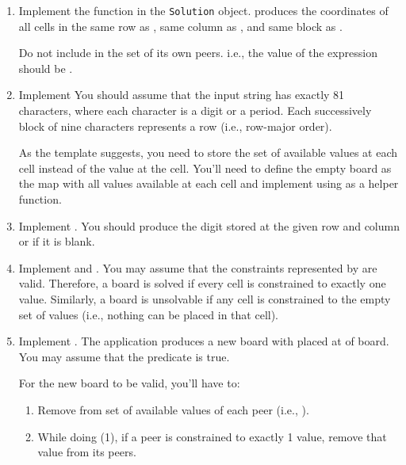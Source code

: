 \documentclass[9pt]{extbook}
\begin{document}
\begin{enumerate}

\item Implement the  function in the \lstinline|Solution|
object.
  produces the coordinates of all cells in the same row as , 
same column as , and same block as .

   Do not include  in the set of its own peers. i.e., the value of
   the expression
    should be .

\item Implement  You should assume that the input 
string has exactly 81 characters, where each character is a digit or a period. 
Each successively block of nine characters represents a row (i.e., row-major order).

   As the template suggests, you need to store the set of available values at
   each cell instead of the value at the cell. You'll need to define
   the empty board as the map with all values available at each cell and
   implement  using  as a helper function.

\item Implement . You should produce the digit stored 
at the given row and column or  if it is blank.

\item Implement  and . You may assume
   that the constraints represented by  are valid. Therefore, a board
   is solved if every cell is constrained to exactly one value. Similarly,
   a board is unsolvable if any cell is constrained to the empty set of values
   (i.e., nothing can be placed in that cell).

\item Implement . The application 
 produces a new board with
    placed at  of 
    board.  You may assume that
   the predicate  is true.

   For the new board to be valid, you'll have to:

   \begin{enumerate}
   \item Remove  from set of available values of each peer
      (i.e., ).
   \item While doing (1), if a peer is constrained to exactly 1 value, remove
      that value from its peers.
   \end{enumerate}


\end{enumerate}
\end{document}
